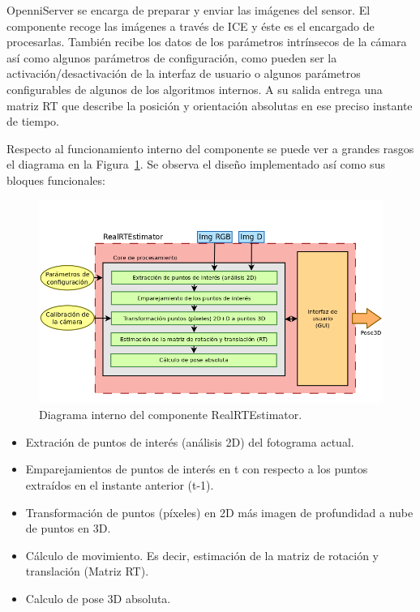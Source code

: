 OpenniServer se encarga de preparar y enviar las imágenes del sensor. El componente recoge las imágenes a través de ICE y éste es el encargado de procesarlas. También recibe los datos de los parámetros intrínsecos de la cámara así como algunos parámetros de configuración, como pueden ser la activación/desactivación de la interfaz de usuario o algunos parámetros configurables de algunos de los algoritmos internos. A su salida entrega una matriz RT que describe la posición y orientación absolutas en ese preciso instante de tiempo. 

Respecto al funcionamiento interno del componente se puede ver a grandes rasgos el diagrama en la Figura~\ref{fig:diagram2}. Se observa el diseño implementado así como sus bloques funcionales:

\begin{figure}[!ht]
\centering
\includegraphics[scale=0.36]{Figures/diagram2.png}
\decoRule
\caption[Diagrama interno del componente RealRTEstimator]{Diagrama interno del componente RealRTEstimator.}
\label{fig:diagram2}
\end{figure}

\begin{itemize}
\item Extración de puntos de interés (análisis 2D) del fotograma actual.

\item Emparejamientos de puntos de interés en t con respecto a los puntos extraídos en el instante anterior (t-1).

\item Transformación de puntos (píxeles) en 2D más imagen de profundidad a nube de puntos en 3D.

\item Cálculo de movimiento. Es decir, estimación de la matriz de rotación y translación (Matriz RT).

\item Calculo de pose 3D absoluta.

\end{itemize}

